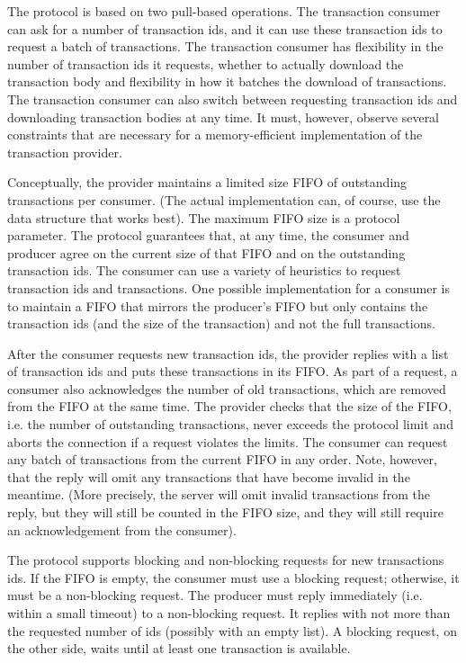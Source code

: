 The protocol is based on two pull-based operations.
The transaction consumer can ask for a number of transaction ids, and it can use these
transaction ids to request a batch of transactions.
The transaction consumer has flexibility in the number of transaction ids it requests,
whether to actually download the transaction body
and flexibility in how it batches the download of transactions.
The transaction consumer can also switch between requesting transaction ids and downloading
transaction bodies at any time.
It must, however, observe several constraints that are necessary for a memory-efficient implementation
of the transaction provider.

Conceptually, the provider maintains a limited size FIFO of outstanding transactions per consumer.
(The actual implementation can, of course, use the data structure that works best).
The maximum FIFO size is a protocol parameter.
The protocol guarantees that, at any time, the consumer and producer agree on the current size of
that FIFO and on the outstanding transaction ids.
The consumer can use a variety of heuristics to request transaction ids and transactions.
One possible implementation for a consumer is to maintain a FIFO that mirrors the producer's FIFO
but only contains the transaction ids (and the size of the transaction) and not the full transactions.

After the consumer requests new transaction ids, the provider replies with a list of transaction ids and
puts these transactions in its FIFO.
As part of a request, a consumer also acknowledges the number of old transactions,
which are removed from the FIFO at the same time.
The provider checks that the size of the FIFO, i.e. the number of outstanding transactions,
never exceeds the protocol limit and aborts the connection if a request violates the limits.
The consumer can request any batch of transactions from the current FIFO in any order.
Note, however, that the reply will omit any transactions that have become invalid in the meantime.
(More precisely, the server will omit invalid transactions from the reply, but they will still be counted in the FIFO
size, and they will still require an acknowledgement from the consumer).

The protocol supports blocking and non-blocking requests for new transactions ids.
If the FIFO is empty, the consumer must use a blocking request; otherwise, it must be a non-blocking request.
The producer must reply immediately (i.e. within a small timeout) to a non-blocking request.
It replies with not more than the requested number of ids (possibly with an empty list).
A blocking request, on the other side, waits until at least one transaction is available.


